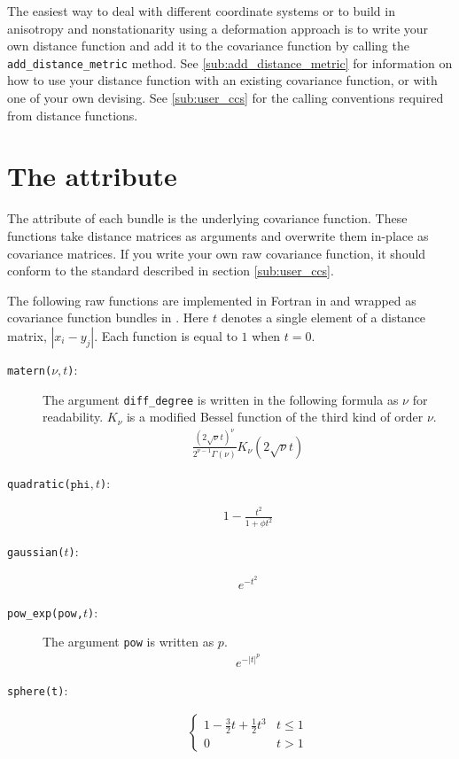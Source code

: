 The easiest way to deal with different coordinate systems or to build in anisotropy and nonstationarity using a deformation approach \cite{sampson} is to write your own distance function and add it to the covariance function by calling the \texttt{add_distance_metric} method. See \ref{sub:add_distance_metric} for information on how to use your distance function with an existing covariance function, or with one of your own devising. See \ref{sub:user_ccs} for the calling conventions required from distance functions.

\section{The  attribute}\label{sub:raw}
The  attribute of each bundle is the underlying covariance function. These functions take distance matrices as arguments and overwrite them in-place as covariance matrices. If you write your own raw covariance function, it should conform to the standard described in section \ref{sub:user_ccs}.

The following raw functions are implemented in Fortran in  and wrapped as covariance function bundles in . Here $t$ denotes a single element of a distance matrix, $|x_i-y_j|$. Each function is equal to $1$ when $t=0$.
\begin{description}
    \item[\texttt{matern($\nu,t$)}:] The argument \texttt{diff_degree} is written in the following formula as $\nu$ for readability. $K_\nu$ is a modified Bessel function of the third kind of order $\nu$.
    \begin{eqnarray*}
        \frac{(2\sqrt{\nu}t)^\nu}{2^{\nu-1}\Gamma(\nu)}K_\nu(2\sqrt{\nu}t)
    \end{eqnarray*}
    \item[\texttt{quadratic($\texttt{phi},t$)}:]
    \begin{eqnarray*}
        1-\frac{t^2}{1+\phi t^2}
    \end{eqnarray*}
    \item[\texttt{gaussian($t$)}:]
    \begin{eqnarray*}
        e^{-t^2}
    \end{eqnarray*}
    \item[\texttt{pow_exp(\texttt{pow},$t$)}:] The argument \texttt{pow} is written as $p$.
    \begin{eqnarray*}
        e^{-|t|^p}
    \end{eqnarray*}
    \item[\texttt{sphere(t)}:]
    \begin{eqnarray}
        \left\{
        \begin{array}{ll}
            1-\frac{3}{2}t+\frac{1}{2}t^3& t\le 1\\
            0 & t > 1
        \end{array} \right.
    \end{eqnarray}
\end{description}

